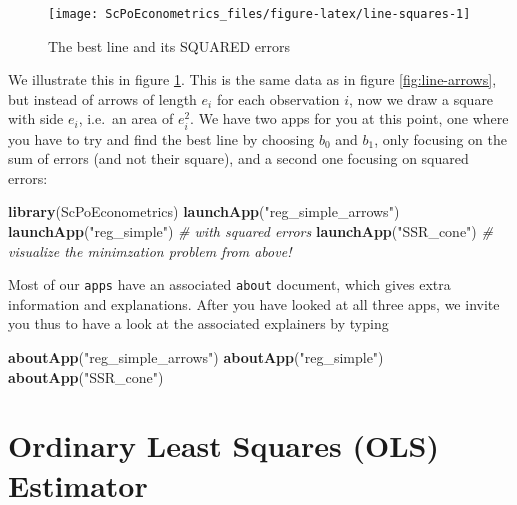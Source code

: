 \documentclass[]{book}
\newenvironment{Shaded}{\begin{snugshade}}{\end{snugshade}}
\newcommand{\CommentTok}[1]{\textcolor[rgb]{0.56,0.35,0.01}{\textit{#1}}}
\newcommand{\KeywordTok}[1]{\textcolor[rgb]{0.13,0.29,0.53}{\textbf{#1}}}
\newcommand{\NormalTok}[1]{#1}
\newcommand{\StringTok}[1]{\textcolor[rgb]{0.31,0.60,0.02}{#1}}
\begin{document}
\begin{figure}

{\centering \texttt{[image: ScPoEconometrics\_files/figure-latex/line-squares-1]} 

}

\caption{The best line and its SQUARED errors}\label{fig:line-squares}
\end{figure}

We illustrate this in figure \ref{fig:line-squares}. This is the same data as in figure \ref{fig:line-arrows}, but instead of arrows of length \(e_i\) for each observation \(i\), now we draw a square with side \(e_i\), i.e.~an area of \(e_i^2\). We have two apps for you at this point, one where you have to try and find the best line by choosing \(b_0\) and \(b_1\), only focusing on the sum of errors (and not their square), and a second one focusing on squared errors:

\begin{Shaded}
\begin{Highlighting}[]
\KeywordTok{library}\NormalTok{(ScPoEconometrics)}
\KeywordTok{launchApp}\NormalTok{(}\StringTok{"reg_simple_arrows"}\NormalTok{)}
\KeywordTok{launchApp}\NormalTok{(}\StringTok{"reg_simple"}\NormalTok{) }\CommentTok{# with squared errors}
\KeywordTok{launchApp}\NormalTok{(}\StringTok{"SSR_cone"}\NormalTok{) }\CommentTok{# visualize the minimzation problem from above!}
\end{Highlighting}
\end{Shaded}

Most of our \texttt{apps} have an associated \texttt{about} document, which gives extra information and explanations. After you have looked at all three apps, we invite you thus to have a look at the associated explainers by typing

\begin{Shaded}
\begin{Highlighting}[]
\KeywordTok{aboutApp}\NormalTok{(}\StringTok{"reg_simple_arrows"}\NormalTok{)}
\KeywordTok{aboutApp}\NormalTok{(}\StringTok{"reg_simple"}\NormalTok{) }
\KeywordTok{aboutApp}\NormalTok{(}\StringTok{"SSR_cone"}\NormalTok{) }
\end{Highlighting}
\end{Shaded}

\hypertarget{OLS}{%
\section{Ordinary Least Squares (OLS) Estimator}\label{OLS}}
\end{document}
